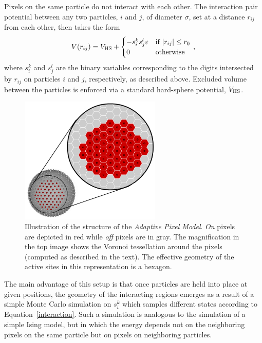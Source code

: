 {Pixels on the same particle do not interact with each other.
The interaction pair potential between any two particles, $i$ and $j$, of diameter $\sigma$, set at a distance $r_{ij}$ from each other, then takes the form
	\begin{equation}
		V(r_{ij}) = V_{\rm HS} + \begin{cases} 	-s_i^ks_j^l\varepsilon		&	\textrm{if } |r_{ij}| \leq r_0 \\
											0 							&	\textrm{otherwise}\end{cases} \,,
		\label{interaction}
	\end{equation}
where $s_i^k$ and $s_j^l$ are the binary variables corresponding to the digits intersected by $r_{ij}$ on particles $i$ and $j$, respectively, as described above.
Excluded volume between the particles is enforced via a standard hard-sphere potential, $V_{\rm HS}$. 
	\begin{figure}
		\begin{center}\includegraphics[width=0.6\textwidth]{pixel/digits.png}\end{center}
		\caption[Illustration of the structure of the {\it Adaptive Pixel Model}]{Illustration of the structure of the {\it Adaptive Pixel  Model}. {\it On} pixels are depicted in red while {\it off} pixels are in gray. The magnification in the top image shows the Voronoi tessellation around the pixels (computed as described in the text). The effective geometry of the active sites in this representation is a hexagon. }
		\label{pixels}
	\end{figure} 

The main advantage of this setup is that once particles are held into place at given positions, the geometry of the interacting regions emerges as a result of a simple Monte Carlo simulation on $s_i^k$ which samples different states according to Equation~\ref{interaction}.
Such a simulation is analogous to the simulation of a simple Ising model, but in which the energy depends not on the neighboring pixels on the same particle but on pixels on neighboring particles.

}
